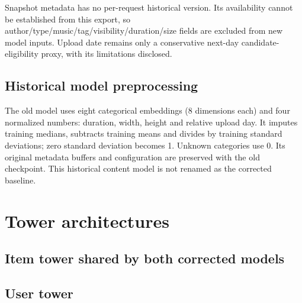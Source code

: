 \documentclass[11pt,a4paper]{article}
\begin{document}
Snapshot metadata has no per-request historical version. Its availability cannot be established from this export, so author/type/music/tag/visibility/duration/size fields are excluded from new model inputs. Upload date remains only a conservative next-day candidate-eligibility proxy, with its limitations disclosed.

\subsection{Historical model preprocessing}
The old model uses eight categorical embeddings (8 dimensions each) and four normalized numbers: duration, width, height and relative upload day. It imputes training medians, subtracts training means and divides by training standard deviations; zero standard deviation becomes 1. Unknown categories use 0. Its original metadata buffers and configuration are preserved with the old checkpoint. This historical content model is not renamed as the corrected baseline.
\clearpage
\section{Tower architectures}
\subsection{Item tower shared by both corrected models}
\begin{center}\end{center}

\subsection{User tower}
\begin{center}\end{center}
\end{document}
